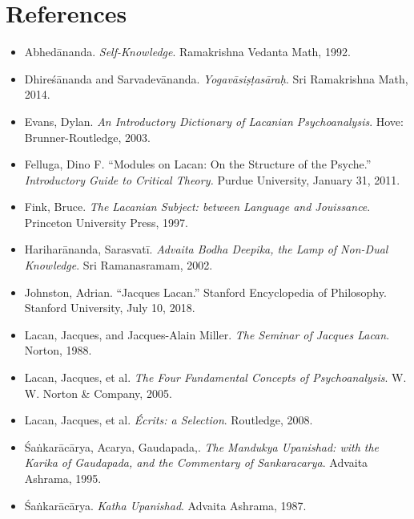 \clearpage
\section*{References}
{
\small
\begin{itemize}[label={},itemindent=-2em,leftmargin=2em]	
	\item Abhed\=ananda. \emph{Self-Knowledge}. Ramakrishna Vedanta Math, 1992.


	\item Dhire\'s\=ananda and Sarvadev\=ananda. \emph{Yogav\=asi\d s\d tas\=ara\d h}. Sri
Ramakrishna Math, 2014.


	\item Evans, Dylan. \emph{An Introductory Dictionary of Lacanian
Psychoanalysis}. {Hove: Brunner-Routledge}, 2003.


	\item Felluga, Dino F\emph{.} ``Modules on Lacan: On the Structure of the
Psyche.'' \emph{Introductory Guide to Critical Theory.} Purdue University, January 31, 2011.

	\item Fink, Bruce. \emph{The Lacanian Subject: between Language and
Jouissance}. Princeton University Press, 1997.

	\item Harihar\=ananda, Sarasvat\=i. \emph{Advaita Bodha Deepika, the Lamp of
Non-Dual Knowledge}. Sri Ramanasramam, 2002.

	\item Johnston, Adrian. ``Jacques Lacan.'' Stanford Encyclopedia of
Philosophy. Stanford University, July 10, 2018.

	\item Lacan, Jacques, and Jacques-Alain Miller. \emph{The Seminar of Jacques
Lacan}. Norton, 1988.

	\item Lacan, Jacques, et al. \emph{The Four Fundamental Concepts of
Psychoanalysis}. W. W. Norton \& Company, 2005.

	\item Lacan, Jacques, et al. \emph{\'Ecrits: a Selection}. Routledge, 2008.

	\item \'Sa\.nkar\=ac\=arya, Acarya, Gaudapada,. \emph{The Mandukya Upanishad: with the
Karika of Gaudapada, and the Commentary of Sankaracarya}. Advaita Ashrama,
1995.

	\item \'Sa\.nkar\=ac\=arya. \emph{Katha Upanishad}. Advaita Ashrama, 1987.
	
\end{itemize}
}